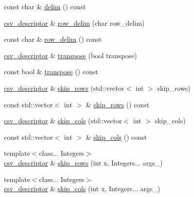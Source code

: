 \begin{DoxyCompactItemize}
\item 
const char \& \hyperlink{structbc_1_1io_1_1csv__descriptor_a693f3a649a00a0df5262b8b017916ad4}{delim} () const
\item 
\hyperlink{structbc_1_1io_1_1csv__descriptor}{csv\+\_\+descriptor} \& \hyperlink{structbc_1_1io_1_1csv__descriptor_a137cc2b12a568abaa751c2f7dc1090a7}{row\+\_\+delim} (char row\+\_\+delim)
\item 
const char \& \hyperlink{structbc_1_1io_1_1csv__descriptor_afede07d16aecc7012ef19bacd49325a6}{row\+\_\+delim} () const
\item 
\hyperlink{structbc_1_1io_1_1csv__descriptor}{csv\+\_\+descriptor} \& \hyperlink{structbc_1_1io_1_1csv__descriptor_a75efaac77205a2ced3f9bf3d1193bbc5}{transpose} (bool transpose)
\item 
const bool \& \hyperlink{structbc_1_1io_1_1csv__descriptor_a7345e71753d61286d5703ea67006a92a}{transpose} () const
\item 
\hyperlink{structbc_1_1io_1_1csv__descriptor}{csv\+\_\+descriptor} \& \hyperlink{structbc_1_1io_1_1csv__descriptor_aee7eba21b2d7bd430dbb8b48c1f3f0e1}{skip\+\_\+rows} (std\+::vector$<$ int $>$ skip\+\_\+rows)
\item 
const std\+::vector$<$ int $>$ \& \hyperlink{structbc_1_1io_1_1csv__descriptor_a1f40717ae361ae4266b7efbcef43284a}{skip\+\_\+rows} () const
\item 
\hyperlink{structbc_1_1io_1_1csv__descriptor}{csv\+\_\+descriptor} \& \hyperlink{structbc_1_1io_1_1csv__descriptor_a9a9760b38f7cacf93ac115773000967e}{skip\+\_\+cols} (std\+::vector$<$ int $>$ skip\+\_\+cols)
\item 
const std\+::vector$<$ int $>$ \& \hyperlink{structbc_1_1io_1_1csv__descriptor_ae24040d7bca8074a721153c3e98625cb}{skip\+\_\+cols} () const
\item 
{\footnotesize template$<$class... Integers$>$ }\\\hyperlink{structbc_1_1io_1_1csv__descriptor}{csv\+\_\+descriptor} \& \hyperlink{structbc_1_1io_1_1csv__descriptor_a2063f9b38324152bdfab1bb8e127f6a5}{skip\+\_\+rows} (int x, Integers... args\+\_\+)
\item 
{\footnotesize template$<$class... Integers$>$ }\\\hyperlink{structbc_1_1io_1_1csv__descriptor}{csv\+\_\+descriptor} \& \hyperlink{structbc_1_1io_1_1csv__descriptor_a759525e5245a06e31e710ac09983b385}{skip\+\_\+cols} (int x, Integers... args\+\_\+)
\end{DoxyCompactItemize}
